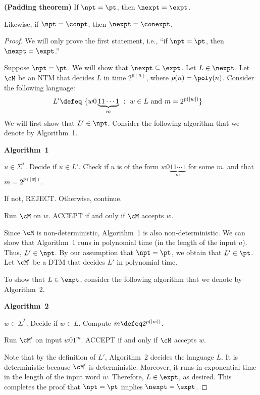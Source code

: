\documentclass[11pt, a4paper]{article}
\begin{document}
\begin{theorem}
\label{theo:padding}
{\bf (Padding theorem)}
If $\npt=\pt$, then $\nexpt=\expt$. 

Likewise, if $\npt=\conpt$, then $\nexpt=\conexpt$.
\end{theorem}
\begin{proof}
We will only prove the first statement, i.e.,
``if $\npt=\pt$, then $\nexpt=\expt$.''

Suppose $\npt=\pt$.
We will show that $\nexpt\subseteq \expt$.
Let $L \in \nexpt$.
Let $\cM$ be an NTM that decides $L$ in time $2^{p(n)}$,
where $p(n)=\poly(n)$.
Consider the following language:
\begin{align*}
L' & \defeq \ \{w0\underbrace{11\cdots 1}_{m} \ :\  w \in L \ \text{and}\ m = 2^{p(|w|)}\} 
\end{align*}
We will first show that $L' \in \npt$.
Consider the following algorithm that we denote by Algorithm~1.

\begin{algorithm}
\label{alg:padding-algo-1}
\caption{\bf Algorithm~1}
\begin{algorithmic}[1]
\REQUIRE
$u \in \Sigma^*$.
\ENSURE
Decide if $u \in L'$.
\STATE
Check if $u$ is of the form $w0\underbrace{11\cdots 1}_{m}$ for some $m$.
and that $m = 2^{p(|w|)}$. 

If not, REJECT.
Otherwise, continue.

\STATE
Run $\cM$ on $w$.
\STATE
ACCEPT if and only if $\cM$ accepts $w$.
\end{algorithmic}
\end{algorithm}

Since $\cM$ is non-deterministic, Algorithm~1 is also non-deterministic.
We can show that Algorithm~1 runs in polynomial time (in the length of the input $u$).
Thus, $L'\in \npt$.
By our assumption that $\npt=\pt$,
we obtain that $L'\in \pt$.
Let $\cM'$ be a DTM that decides $L'$ in polynomial time.

To show that $L \in \expt$,
consider the following algorithm that we denote by Algorithm~2.

\begin{algorithm}
\label{alg:padding-algo-2}
\caption{\bf Algorithm~2}
\begin{algorithmic}[1]
\REQUIRE
$w \in \Sigma^*$.
\ENSURE
Decide if $w \in L$.
\STATE
Compute $m \defeq 2^{p(|w|)}$.

\STATE
Run $\cM'$ on input $w 0 1^m$.
\STATE
ACCEPT if and only if $\cM$ accepts $w$.
\end{algorithmic}
\end{algorithm}

Note that by the definition of $L'$,
Algorithm~2 decides the language $L$.
It is deterministic because $\cM'$ is deterministic.
Moreover, it runs in exponential time in the length of the input word $w$.
Therefore, $L \in \expt$, as desired.
This completes the proof 
that $\npt=\pt$ implies $\nexpt=\expt$. 
\end{proof}
\end{document}
